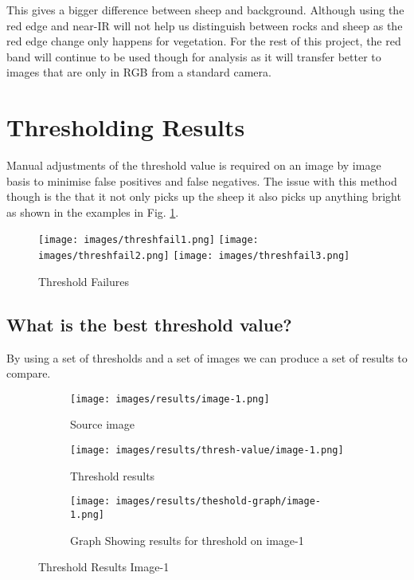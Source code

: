 This gives a bigger difference between sheep and background. Although using the red edge and near-IR will not help us distinguish between rocks and sheep as the red edge change only happens for vegetation. For the rest of this project, the red band will continue to be used though for analysis as it will transfer better to images that are only in RGB from a standard camera.

\clearpage
\section{Thresholding Results}

Manual adjustments of the threshold value is required on an image by image basis to minimise false positives and false negatives. The issue with this method though is the that it not only picks up the sheep it also picks up anything bright as shown in the examples in Fig. \ref{fig:threshfailures}.
    
    \begin{figure}
        \centering
        \texttt{[image: images/threshfail1.png]}
        \texttt{[image: images/threshfail2.png]}
        \texttt{[image: images/threshfail3.png]}
        \caption{Threshold Failures}
        \label{fig:threshfailures}
    \end{figure}
    
\subsection{What is the best threshold value?}

By using a set of thresholds and a set of images we can produce a set of results to compare.

\begin{figure}[H]
    \centering

\begin{subfigure}{.5\textwidth}
    \centering
    \texttt{[image: images/results/image-1.png]}
    \caption{Source image}

\end{subfigure}%
\begin{subfigure}{.5\textwidth}
\centering
    \texttt{[image: images/results/thresh-value/image-1.png]}
    \caption{Threshold results}

\end{subfigure}
\begin{subfigure}{.9\textwidth}
\centering
    \texttt{[image: images/results/theshold-graph/image-1.png]}
    \caption{Graph Showing results for threshold on image-1}
\end{subfigure}%

    \caption{Threshold Results Image-1}
    \label{fig:Threshold-Results-Image-1}
\end{figure}

